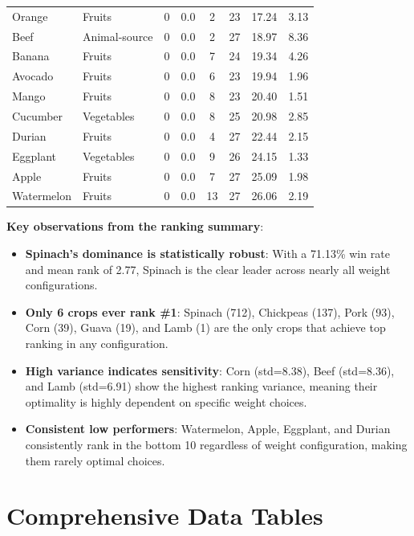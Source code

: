 \documentclass{oqireport}
\begin{document}
\begin{table}[H]
\begin{tabular}{llcccccc}
Orange & Fruits & 0 & 0.0 & 2 & 23 & 17.24 & 3.13 \\
Beef & Animal-source & 0 & 0.0 & 2 & 27 & 18.97 & 8.36 \\
Banana & Fruits & 0 & 0.0 & 7 & 24 & 19.34 & 4.26 \\
Avocado & Fruits & 0 & 0.0 & 6 & 23 & 19.94 & 1.96 \\
Mango & Fruits & 0 & 0.0 & 8 & 23 & 20.40 & 1.51 \\
Cucumber & Vegetables & 0 & 0.0 & 8 & 25 & 20.98 & 2.85 \\
Durian & Fruits & 0 & 0.0 & 4 & 27 & 22.44 & 2.15 \\
Eggplant & Vegetables & 0 & 0.0 & 9 & 26 & 24.15 & 1.33 \\
Apple & Fruits & 0 & 0.0 & 7 & 27 & 25.09 & 1.98 \\
Watermelon & Fruits & 0 & 0.0 & 13 & 27 & 26.06 & 2.19 \\
\bottomrule
\end{tabular}
\end{table}

\textbf{Key observations from the ranking summary}:
\begin{itemize}
\item \textbf{Spinach's dominance is statistically robust}: With a 71.13\% win rate and mean rank of 2.77, Spinach is the clear leader across nearly all weight configurations.
\item \textbf{Only 6 crops ever rank \#1}: Spinach (712), Chickpeas (137), Pork (93), Corn (39), Guava (19), and Lamb (1) are the only crops that achieve top ranking in any configuration.
\item \textbf{High variance indicates sensitivity}: Corn (std=8.38), Beef (std=8.36), and Lamb (std=6.91) show the highest ranking variance, meaning their optimality is highly dependent on specific weight choices.
\item \textbf{Consistent low performers}: Watermelon, Apple, Eggplant, and Durian consistently rank in the bottom 10 regardless of weight configuration, making them rarely optimal choices.
\end{itemize}


\newpage
\section{Comprehensive Data Tables}
\label{sec:appendix_tables}
\end{document}
